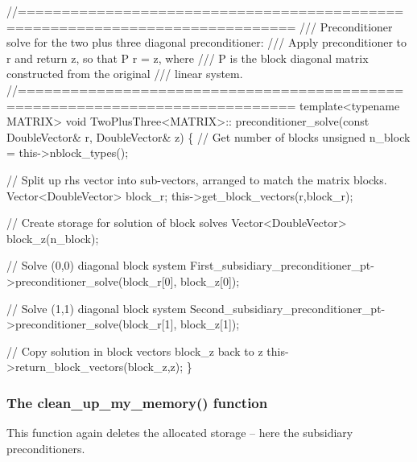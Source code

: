 \begin{DoxyCodeInclude}
 \textcolor{comment}{//=============================================================================}\textcolor{comment}{}
\textcolor{comment}{ /// Preconditioner solve for the two plus three diagonal preconditioner: }
\textcolor{comment}{ /// Apply preconditioner to r and return z, so that P r = z, where}
\textcolor{comment}{ /// P is the block diagonal matrix constructed from the original }
\textcolor{comment}{ /// linear system.}
\textcolor{comment}{} \textcolor{comment}{//=============================================================================}
 \textcolor{keyword}{template}<\textcolor{keyword}{typename} MATRIX> 
 \textcolor{keywordtype}{void} TwoPlusThree<MATRIX>::
 preconditioner\_solve(\textcolor{keyword}{const} DoubleVector& r, DoubleVector& z)
 \{   
  \textcolor{comment}{// Get number of blocks}
  \textcolor{keywordtype}{unsigned} n\_block = this->nblock\_types();

  \textcolor{comment}{// Split up rhs vector into sub-vectors, arranged to match the matrix blocks.}
  Vector<DoubleVector> block\_r;
  this->get\_block\_vectors(r,block\_r);

  \textcolor{comment}{// Create storage for solution of block solves}
  Vector<DoubleVector> block\_z(n\_block);

  \textcolor{comment}{// Solve (0,0) diagonal block system}
  First\_subsidiary\_preconditioner\_pt->preconditioner\_solve(block\_r[0],
                                                           block\_z[0]);
  
  \textcolor{comment}{// Solve (1,1) diagonal block system}
  Second\_subsidiary\_preconditioner\_pt->preconditioner\_solve(block\_r[1],
                                                            block\_z[1]);
  
  \textcolor{comment}{// Copy solution in block vectors block\_z back to z}
  this->return\_block\_vectors(block\_z,z);
 \}

\end{DoxyCodeInclude}
\hypertarget{index_two_plus_three_clean}{}\subsubsection{The clean\+\_\+up\+\_\+my\+\_\+memory() function}\label{index_two_plus_three_clean}
This function again deletes the allocated storage -- here the subsidiary preconditioners.


